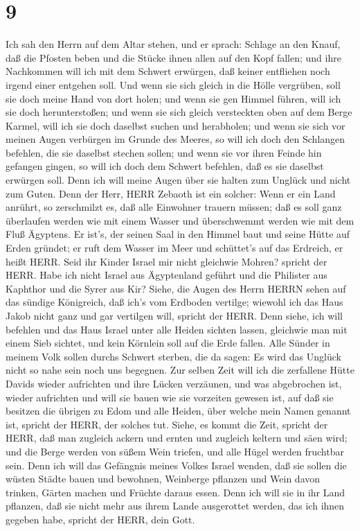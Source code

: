 \hypertarget{section-8}{%
\section{9}\label{section-8}}

 Ich sah den Herrn auf dem Altar stehen, und er sprach:
Schlage an den Knauf, daß die Pfosten beben und die Stücke ihnen allen
auf den Kopf fallen; und ihre Nachkommen will ich mit dem Schwert
erwürgen, daß keiner entfliehen noch irgend einer entgehen soll.
 Und wenn sie sich gleich in die Hölle vergrüben, soll sie
doch meine Hand von dort holen; und wenn sie gen Himmel führen, will ich
sie doch herunterstoßen;  und wenn sie sich gleich
versteckten oben auf dem Berge Karmel, will ich sie doch daselbst suchen
und herabholen; und wenn sie sich vor meinen Augen verbürgen im Grunde
des Meeres, so will ich doch den Schlangen befehlen, die sie daselbst
stechen sollen;  und wenn sie vor ihren Feinde hin gefangen
gingen, so will ich doch dem Schwert befehlen, daß es sie daselbst
erwürgen soll. Denn ich will meine Augen über sie halten zum Unglück und
nicht zum Guten.  Denn der Herr, HERR Zebaoth ist ein
solcher: Wenn er ein Land anrührt, so zerschmilzt es, daß alle Einwohner
trauern müssen; daß es soll ganz überlaufen werden wie mit einem Wasser
und überschwemmt werden wie mit dem Fluß Ägyptens.  Er
ist's, der seinen Saal in den Himmel baut und seine Hütte auf Erden
gründet; er ruft dem Wasser im Meer und schüttet's auf das Erdreich, er
heißt HERR.  Seid ihr Kinder Israel mir nicht gleichwie
Mohren? spricht der HERR. Habe ich nicht Israel aus Ägyptenland geführt
und die Philister aus Kaphthor und die Syrer aus Kir? 
Siehe, die Augen des Herrn HERRN sehen auf das sündige Königreich, daß
ich's vom Erdboden vertilge; wiewohl ich das Haus Jakob nicht ganz und
gar vertilgen will, spricht der HERR.  Denn siehe, ich will
befehlen und das Haus Israel unter alle Heiden sichten lassen, gleichwie
man mit einem Sieb sichtet, und kein Körnlein soll auf die Erde fallen.
 Alle Sünder in meinem Volk sollen durchs Schwert sterben,
die da sagen: Es wird das Unglück nicht so nahe sein noch uns begegnen.
 Zur selben Zeit will ich die zerfallene Hütte Davids
wieder aufrichten und ihre Lücken verzäunen, und was abgebrochen ist,
wieder aufrichten und will sie bauen wie sie vorzeiten gewesen ist,
 auf daß sie besitzen die übrigen zu Edom und alle Heiden,
über welche mein Namen genannt ist, spricht der HERR, der solches tut.
 Siehe, es kommt die Zeit, spricht der HERR, daß man
zugleich ackern und ernten und zugleich keltern und säen wird; und die
Berge werden von süßem Wein triefen, und alle Hügel werden fruchtbar
sein.  Denn ich will das Gefängnis meines Volkes Israel
wenden, daß sie sollen die wüsten Städte bauen und bewohnen, Weinberge
pflanzen und Wein davon trinken, Gärten machen und Früchte daraus essen.
 Denn ich will sie in ihr Land pflanzen, daß sie nicht mehr
aus ihrem Lande ausgerottet werden, das ich ihnen gegeben habe, spricht
der HERR, dein Gott.
